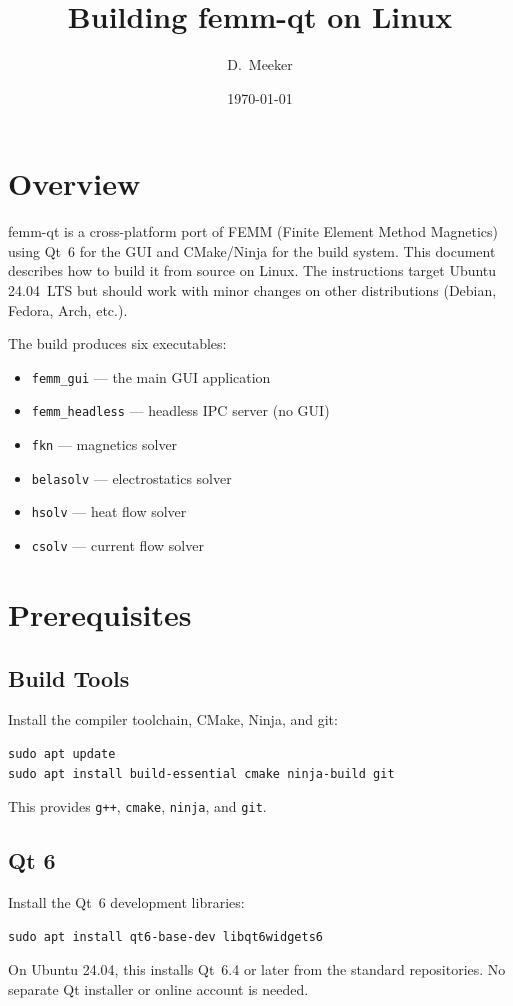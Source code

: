 \documentclass[11pt]{article}
\title{Building femm-qt on Linux}
\author{D.\ Meeker}
\date{\today}
\begin{document}
\maketitle

\section{Overview}

femm-qt is a cross-platform port of FEMM (Finite Element Method Magnetics)
using Qt~6 for the GUI and CMake/Ninja for the build system.  This document
describes how to build it from source on Linux.  The instructions target
Ubuntu 24.04~LTS but should work with minor changes on other distributions
(Debian, Fedora, Arch, etc.).

The build produces six executables:
\begin{itemize}[nosep]
  \item \texttt{femm\_gui} --- the main GUI application
  \item \texttt{femm\_headless} --- headless IPC server (no GUI)
  \item \texttt{fkn} --- magnetics solver
  \item \texttt{belasolv} --- electrostatics solver
  \item \texttt{hsolv} --- heat flow solver
  \item \texttt{csolv} --- current flow solver
\end{itemize}

\section{Prerequisites}

\subsection{Build Tools}

Install the compiler toolchain, CMake, Ninja, and git:
\begin{lstlisting}
sudo apt update
sudo apt install build-essential cmake ninja-build git
\end{lstlisting}
This provides \texttt{g++}, \texttt{cmake}, \texttt{ninja}, and \texttt{git}.

\subsection{Qt 6}

Install the Qt~6 development libraries:
\begin{lstlisting}
sudo apt install qt6-base-dev libqt6widgets6
\end{lstlisting}
On Ubuntu 24.04, this installs Qt~6.4 or later from the standard
repositories.  No separate Qt installer or online account is needed.
\end{document}
